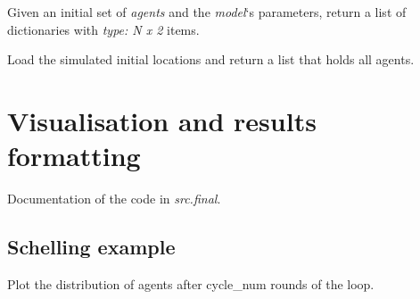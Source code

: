 \documentclass[a4paper,11pt,english]{sphinxmanual}
\begin{document}
\begin{fulllineitems}
\label{analysis:src.analysis.schelling.run_analysis}
Given an initial set of \emph{agents} and the \emph{model}`s parameters,
return a list of dictionaries with \emph{type: N x 2} items.

\end{fulllineitems}


\begin{fulllineitems}
\label{analysis:src.analysis.schelling.setup_agents}
Load the simulated initial locations and return a list
that holds all agents.

\end{fulllineitems}



\chapter{Visualisation and results formatting}
\label{final::doc}\label{final:visualisation-and-results-formatting}\label{final:final}
Documentation of the code in \emph{src.final}.


\section{Schelling example}
\label{final:module-src.final.plot_locations}\label{final:schelling-example}

\begin{fulllineitems}
\label{final:src.final.plot_locations.plot_locations}
Plot the distribution of agents after cycle\_num rounds of the loop.

\end{fulllineitems}
\end{document}
